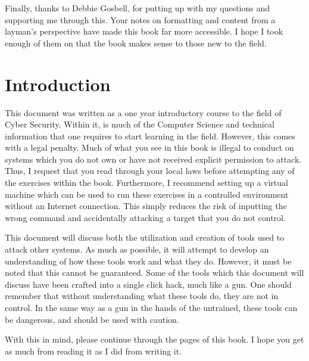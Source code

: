 \documentclass[twoside,a4paper,11pt]{report}
\begin{document}
	Finally, thanks to Debbie Gosbell, for putting up with my questions and supporting me through this. 
	Your notes on formatting and content from a layman's perspective have made this book far more accessible. 
	I hope I took enough of them on that the book makes sense to those new to the field. 

\chapter*{Introduction}
\pagestyle{fancy}
	This document was written as a one year introductory course to the field of Cyber Security. 
	Within it, is much of the Computer Science and technical information that one requires to start learning in the field. 
	However, this comes with a legal penalty. 
	Much of what you see in this book is illegal to conduct on systems which you do not own or have not received explicit permission to attack. 
	Thus, I request that you read through your local laws before attempting any of the exercises within the book. 
	Furthermore, I recommend setting up a virtual machine which can be used to run these exercises in a controlled environment without an Internet connection. 
	This simply reduces the risk of inputting the wrong command and accidentally attacking a target that you do not control. 

	This document will discuss both the utilization and creation of tools used to attack other systems. 
	As much as possible, it will attempt to develop an understanding of how these tools work and what they do. 
	However, it must be noted that this cannot be guaranteed. 
	Some of the tools which this document will discuss have been crafted into a single click hack, much like a gun. 
	One should remember that without understanding what these tools do, they are not in control. 
	In the same way as a gun in the hands of the untrained, these tools can be dangerous, and should be used with caution. 

	With this in mind, please continue through the pages of this book. 
	I hope you get as much from reading it as I did from writing it. 
\end{document}
